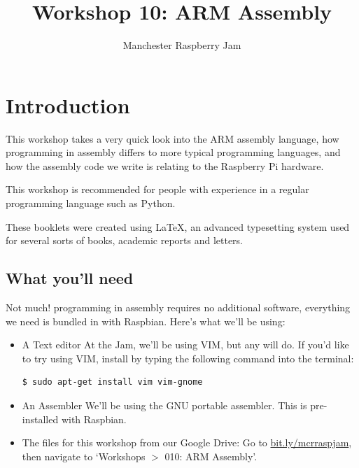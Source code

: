 \documentclass[a4paper, twocolumn, twoside, 11pt]{article}
\begin{document}
	\author{Manchester Raspberry Jam}
	\title{Workshop 10: ARM Assembly}
	\date{}

	\maketitle
	
	\setcounter{tocdepth}{1}
	\tableofcontents
	
	\setcounter{section}{-1}
	\section{Introduction}

		This workshop takes a very quick look into the ARM assembly language, how programming in assembly differs to more typical programming languages, and how the assembly code we write is relating to the Raspberry Pi hardware.
		
		This workshop is recommended for people with experience in a regular programming language such as Python.
		
		These booklets were created using {\selectfont \LaTeX}, an advanced typesetting system used for several sorts of books, academic reports and letters.
	
		\subsection*{What you'll need}
			Not much! programming in assembly requires no additional software, everything we need is bundled in with Raspbian. Here's what we'll be using:
	
			\begin{itemize}			
				\item A Text editor
				\scriptsize\newline At the Jam, we'll be using VIM, but any will do. If you'd like to try using VIM, install by typing the following command into the terminal:
				\begin{lstlisting}
$ sudo apt-get install vim vim-gnome
				\end{lstlisting}
				\normalsize
			
				\item An Assembler
				\scriptsize\newline We'll be using the GNU portable assembler. This is pre-installed with Raspbian.
				\normalsize
			
				\item The files for this workshop from our Google Drive:
				\scriptsize\newline Go to \url{bit.ly/mcrraspjam}, then navigate to `Workshops $>$ 010: ARM Assembly'.
				\normalsize
			\end{itemize}
	
\end{document}

